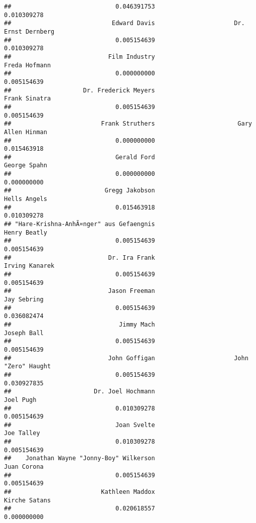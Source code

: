 \documentclass[
]{article}
\begin{document}
\begin{verbatim}
##                             0.046391753                             0.010309278 
##                            Edward Davis                      Dr. Ernst Dernberg 
##                             0.005154639                             0.010309278 
##                           Film Industry                           Freda Hofmann 
##                             0.000000000                             0.005154639 
##                    Dr. Frederick Meyers                           Frank Sinatra 
##                             0.005154639                             0.005154639 
##                         Frank Struthers                       Gary Allen Hinman 
##                             0.000000000                             0.015463918 
##                             Gerald Ford                            George Spahn 
##                             0.000000000                             0.000000000 
##                          Gregg Jakobson                            Hells Angels 
##                             0.015463918                             0.010309278 
## "Hare-Krishna-AnhÃ¤nger" aus Gefaengnis                            Henry Beatly 
##                             0.005154639                             0.005154639 
##                           Dr. Ira Frank                          Irving Kanarek 
##                             0.005154639                             0.005154639 
##                           Jason Freeman                             Jay Sebring 
##                             0.005154639                             0.036082474 
##                              Jimmy Mach                             Joseph Ball 
##                             0.005154639                             0.005154639 
##                           John Goffigan                      John "Zero" Haught 
##                             0.005154639                             0.030927835 
##                       Dr. Joel Hochmann                               Joel Pugh 
##                             0.010309278                             0.005154639 
##                             Joan Svelte                              Joe Talley 
##                             0.010309278                             0.005154639 
##    Jonathan Wayne "Jonny-Boy" Wilkerson                             Juan Corona 
##                             0.005154639                             0.005154639 
##                         Kathleen Maddox                           Kirche Satans 
##                             0.020618557                             0.000000000 

\end{verbatim}
\end{document}
